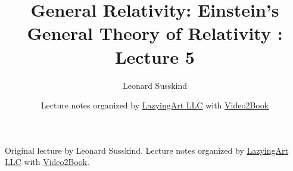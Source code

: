 \documentclass[11pt,oneside]{book}
\begin{document}
\frontmatter
\title{General Relativity: Einstein's General Theory of Relativity : Lecture 5}
\author{Leonard Susskind}
\date{Lecture notes organized by \href{https://lazying.art}{LazyingArt LLC} with \href{https://github.com/lachlanchen/Video2Book}{Video2Book}}
\maketitle
\begin{center}
\small Original lecture by Leonard Susskind. Lecture notes organized by \href{https://lazying.art}{LazyingArt LLC} with \href{https://github.com/lachlanchen/Video2Book}{Video2Book}.
\end{center}
\clearpage
\mainmatter

\end{document}
